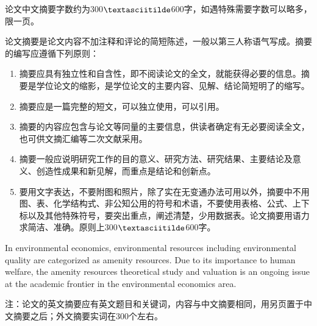 \begin{ChineseAbstract}
论文中文摘要字数约为300$\textasciitilde$600字，如遇特殊需要字数可以略多，限一页。

论文摘要是论文内容不加注释和评论的简短陈述，一般以第三人称语气写成。摘要的编写应遵循下列原则：
\begin{enumerate}[label={\arabic*)},itemindent=3.5em,leftmargin=0em] 
\item 摘要应具有独立性和自含性，即不阅读论文的全文，就能获得必要的信息。摘要是学位论文的缩影，是学位论文的主要内容、见解、结论简短明了的缩写。
\item 摘要应是一篇完整的短文，可以独立使用，可以引用。
\item 摘要的内容应包含与论文等同量的主要信息，供读者确定有无必要阅读全文，也可供文摘汇编等二次文献采用。
\item 摘要一般应说明研究工作的目的意义、研究方法、研究结果、主要结论及意义、创造性成果和新见解，而重点是结论和创新点。
\item 要用文字表达，不要附图和照片，除了实在无变通办法可用以外，摘要中不用图、表、化学结构式、非公知公用的符号和术语，不要使用表格、公式、上下标以及其他特殊符号，要突出重点，阐述清楚，少用数据表。论文摘要用语力求简洁、准确。原则上300$\textasciitilde$600字。
\end{enumerate}

\end{ChineseAbstract}

\begin{EnglishAbstract}

   In environmental economics, environmental resources including environmental quality are categorized as amenity resources. Due to its importance to human welfare, the amenity resources theoretical study and valuation is an ongoing issue at the academic frontier in the environmental economics area.  
  
注：论文的英文摘要应有英文题目和关键词，内容与中文摘要相同，用另页置于中文摘要之后；外文摘要实词在300个左右。


\end{EnglishAbstract}
